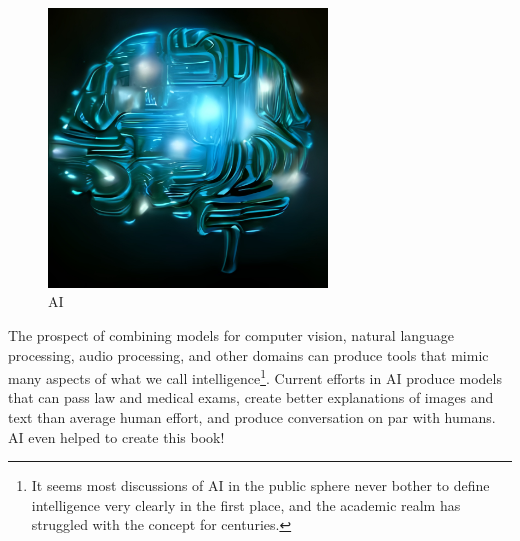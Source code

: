 \documentclass[
  letterpaper,
]{krantz}
\begin{document}
\begin{figure}

{\centering \includegraphics[width=0.66\textwidth,height=\textheight]{img/ai_by_dalle.jpeg}

}

\caption{AI}

\end{figure}

The prospect of combining models for computer vision, natural language
processing, audio processing, and other domains can produce tools that
mimic many aspects of what we call intelligence\footnote{It seems most
  discussions of AI in the public sphere never bother to define
  intelligence very clearly in the first place, and the academic realm
  has struggled with the concept for centuries.}. Current efforts in AI
produce models that can pass law and medical exams, create better
explanations of images and text than average human effort, and produce
conversation on par with humans. AI even helped to create this book!
\end{document}
